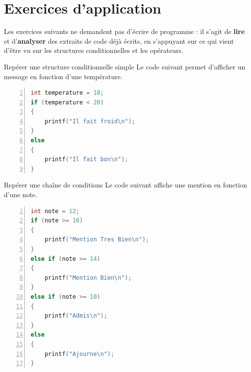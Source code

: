 \section{Exercices d'application}

Les exercices suivants ne demandent pas d'écrire de programme : il s'agit de \textbf{lire} et d'\textbf{analyser} des extraits de code déjà écrits, en s'appuyant sur ce qui vient d'être vu sur les structures conditionnelles et les opérateurs.

\begin{UPSTIexercice}{Repérer une structure conditionnelle simple}
	Le code suivant permet d'afficher un message en fonction d'une température.

	\begin{lstlisting}[language=c, numbers=left]
int temperature = 18;
if (temperature < 20)
{
    printf("Il fait froid\n");
}
else
{
    printf("Il fait bon\n");
}
	\end{lstlisting}

\end{UPSTIexercice}

\begin{UPSTIexercice}{Repérer une chaîne de conditions}
	Le code suivant affiche une mention en fonction d'une note.

	\begin{lstlisting}[language=c, numbers=left]
int note = 12;
if (note >= 16)
{
    printf("Mention Tres Bien\n");
}
else if (note >= 14)
{
    printf("Mention Bien\n");
}
else if (note >= 10)
{
    printf("Admis\n");
}
else
{
    printf("Ajourne\n");
}
	\end{lstlisting}

\end{UPSTIexercice}

